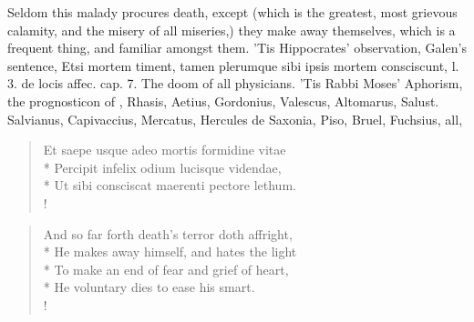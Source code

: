 Seldom this malady procures death, except (which is the greatest,
most grievous calamity, and the misery of all miseries,) they make away
themselves, which is a frequent thing, and familiar amongst them. 'Tis
Hippocrates' observation, Galen's sentence, Etsi mortem timent,
tamen plerumque sibi ipsis mortem consciscunt, l. 3. de locis affec.
cap. 7. The doom of all physicians. 'Tis Rabbi Moses' Aphorism,
the prognosticon of \Avicenna{}, Rhasis, Aetius, Gordonius, Valescus,
Altomarus, Salust. Salvianus, Capivaccius, Mercatus, Hercules de
Saxonia, Piso, Bruel, Fuchsius, all, \etc{}

\begin{latin}%
\begin{verse}%
Et saepe usque adeo mortis formidine vitae\\*
Percipit infelix odium lucisque videndae,\\*
Ut sibi consciscat maerenti pectore lethum.\\!
\end{verse}%
\end{latin}%
\translationrule%
\begin{verse}%
And so far forth death's terror doth affright,\\*
He makes away himself, and hates the light\\*
To make an end of fear and grief of heart,\\*
He voluntary dies to ease his smart.\\!
\end{verse}%
%

